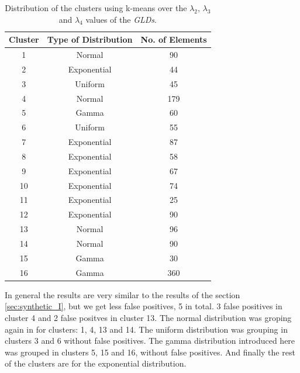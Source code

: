 \begin{table}[]
\centering
\caption{Distribution of the clusters using k-means over the $\lambda_{2}$, $\lambda_{3}$ and $\lambda_{4}$ values of the \textit{GLDs}.}
\label{tab:dataset2_l2l3l4}
\begin{tabular}{|c|c|c|}
\hline
Cluster & Type of Distribution & No. of Elements \\ \hline
1       & Normal          & 90              \\ \hline
2       & Exponential          & 44              \\ \hline
3       & Uniform          & 45             \\ \hline
4       & Normal               & 179              \\ \hline
5       & Gamma               & 60             \\ \hline
6       & Uniform               & 55            \\ \hline
7       & Exponential              & 87            \\ \hline
8       & Exponential          & 58              \\ \hline
9       & Exponential          & 67               \\ \hline
10      & Exponential               & 74              \\ \hline
11      & Exponential          & 25              \\ \hline
12       & Exponential              & 90             \\ \hline
13       & Normal          & 96              \\ \hline
14       & Normal          & 90              \\ \hline
15      & Gamma               & 30              \\ \hline
16      & Gamma          & 360              \\ \hline
\end{tabular}
\end{table}

In general the results are very similar to the results of the section \ref{sec:synthetic_I}, but we get less false positives, 5 in total. 3 false positives in cluster 4 and 2 false positves in cluster 13. The normal distribution was groping again in for clusters: 1, 4, 13 and 14. The uniform distribution was grouping in clusters 3 and 6 without false positives. The gamma distribution introduced here was grouped in clusters 5, 15 and 16, without false positives. And finally the rest of the clusters are for the exponential distribution.

